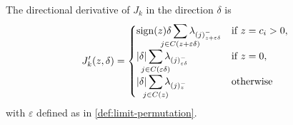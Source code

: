 \begin{theorem}\label{thm:sl1-directional-derivative}
  The directional derivative of \(J_k\) in the direction \(\delta\) is
  \[
    J'_k(z, \delta) =
    \begin{cases}
      \sign(z)\delta\smashoperator{\sum_{j \in C(z + \varepsilon \delta)}}
      \lambda_{(j)^-_{z + \varepsilon\delta}}                      & \text{if } z = c_i > 0, \\
      |\delta|\smashoperator{\sum_{j \in C(\varepsilon \delta)}}
      \lambda_{(j)^-_{\varepsilon\delta}}                          & \text{if } z = 0,       \\
      |\delta| \smashoperator{\sum_{j \in C(z)}} \lambda_{(j)^-_z} & \text{otherwise}
    \end{cases}
  \]
  with \(\varepsilon\) defined as in \cref{def:limit-permutation}.
\end{theorem}
